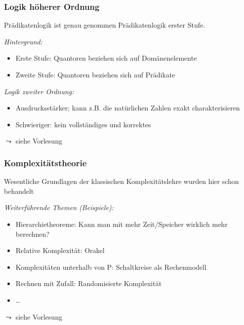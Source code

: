 \documentclass[onlymath]{beamer}
\begin{document}
\begin{frame}\frametitle{Logik höherer Ordnung}

Prädikatenlogik ist genau genommen \alert{Prädikatenlogik erster Stufe}.
\bigskip

\emph{Hintergrund:}
\begin{itemize}
\item Erste Stufe: Quantoren beziehen sich auf Domänenelemente\smallskip

\item Zweite Stufe: Quantoren beziehen sich auf Prädikate\smallskip

\end{itemize}\bigskip

\emph{Logik zweiter Ordnung:}
\begin{itemize}
\item Ausdrucksstärker; kann z.B. die natürlichen Zahlen exakt charakterisieren
\item Schwieriger: kein vollständiges und korrektes 
\end{itemize}

$\leadsto$ siehe Vorlesung 

\end{frame}

\begin{frame}\frametitle{Komplexitätstheorie}

Wesentliche Grundlagen der klassischen Komplexitätslehre wurden hier schon behandelt
\bigskip

\emph{Weiterführende Themen (Beispiele):}
\begin{itemize}
\item Hierarchietheoreme: Kann man mit mehr Zeit/Speicher wirklich mehr berechnen?
\item Relative Komplexität: Orakel
\item Komplexitäten unterhalb von P: Schaltkreise als Rechenmodell
\item Rechnen mit Zufall: Randomisierte Komplexität
\item \ldots
\end{itemize}

$\leadsto$ siehe Vorlesung 

\end{frame}
\end{document}
